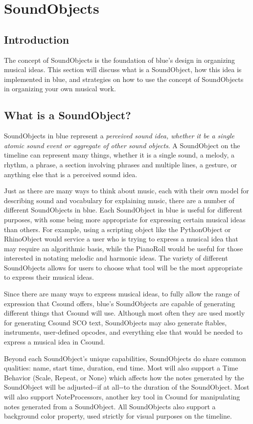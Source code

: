 \section{SoundObjects}\label{conceptsSoundObjects}

\subsection{Introduction}

The concept of SoundObjects is the foundation of blue's design in
organizing musical ideas. This section will discuss what is a
SoundObject, how this idea is implemented in blue, and strategies on how
to use the concept of SoundObjects in organizing your own musical work.

\subsection{What is a SoundObject?}

SoundObjects in blue represent a \emph{perceived sound idea, whether it
be a single atomic sound event or aggregate of other sound objects}. A
SoundObject on the timeline can represent many things, whether it is a
single sound, a melody, a rhythm, a phrase, a section involving phrases
and multiple lines, a gesture, or anything else that is a perceived
sound idea.

Just as there are many ways to think about music, each with their own
model for describing sound and vocabulary for explaining music, there
are a number of different SoundObjects in blue. Each SoundObject in blue
is useful for different purposes, with some being more appropriate for
expressing certain musical ideas than others. For example, using a
scripting object like the PythonObject or RhinoObject would service a
user who is trying to express a musical idea that may require an
algorithmic basis, while the PianoRoll would be useful for those
interested in notating melodic and harmonic ideas. The variety of
different SoundObjects allows for users to choose what tool will be the
most appropriate to express their musical ideas.

Since there are many ways to express musical ideas, to fully allow the
range of expression that Csound offers, blue's SoundObjects are capable
of generating different things that Csound will use. Although most often
they are used mostly for generating Csound SCO text, SoundObjects may
also generate ftables, instruments, user-defined opcodes, and everything
else that would be needed to express a musical idea in Csound.

Beyond each SoundObject's unique capabilities, SoundObjects do share
common qualities: name, start time, duration, end time. Most will also
support a Time Behavior (Scale, Repeat, or None) which affects how the
notes generated by the SoundObject will be adjusted-\/-if at all-\/-to
the duration of the SoundObject. Most will also support NoteProcessors,
another key tool in Csound for manipulating notes generated from a
SoundObject. All SoundObjects also support a background color property,
used strictly for visual purposes on the timeline.

